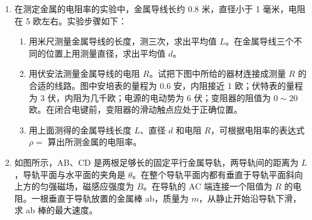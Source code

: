 \documentclass[\gkver]{gaokaozhenti}
\begin{document}
\begin{enumerate}


\item
在测定金属的电阻率的实验中，金属导线长约 0.8 米，直径小于 1 毫米，电阻在 5 欧左右。实验步骤如下：
\begin{enumerate}
	\item
	用米尺测量金属导线的长度，测三次，求出平均值 $L$。在金属导线三个不同的位置上用测量直径，求出平均值 $d$。
	\item
	用伏安法测量金属导线的电阻 $R$。试把下图中所给的器材连接成测量 $R$ 的合适的线路。图中安培表的量程为 0.6 安，内阻接近 1 欧；伏特表的量程为 3 伏，内阻为几千欧；电源的电动势为 6 伏；变阻器的阻值为 $0\sim20$ 欧。在闭合电键前，变阻器的滑动触点应处于正确位置。
	\item
	用上面测得的金属导线长度 $L$、直径 $d$ 和电阻 $R$，可根据电阻率的表达式 $\rho=$ 算出所测金属的电阻率。
\end{enumerate}



\item
如图所示，AB、CD 是两根足够长的固定平行金属导轨，两导轨间的距离为 $L$，导轨平面与水平面的夹角是 $\theta$。在整个导轨平面内都有垂直于导轨平面斜向上方的匀强磁场，磁感应强度为 $B$。在导轨的 AC 端连接一个阻值为 $R$ 的电阻。一根垂直于导轨放置的金属棒 ab，质量为 $m$，从静止开始沿导轨下滑，求 ab 棒的最大速度。


\end{enumerate}
\end{document}
